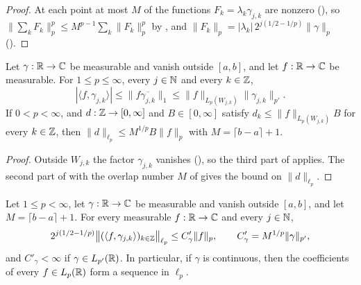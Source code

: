 \begin{proof}
\leanok
{}
At each point at most $M$ of the functions $F_k = \lambda_k \gamma_{j,k}$ are nonzero
(), so
$\|\sum_k F_k\|_p^p \leq M^{p-1} \sum_k \|F_k\|_p^p$ by , and
$\|F_k\|_p = |\lambda_k| \, 2^{j(1/2 - 1/p)} \|\gamma\|_p$ ().
\end{proof}

\begin{lemma}
\label{lem:daub-coeff-local}
\leanok
{}
Let $\gamma : \mathbb{R} \to \mathbb{C}$ be measurable and vanish outside $[a, b]$, and let $f : \mathbb{R} \to \mathbb{C}$ be
measurable. For $1 \leq p \leq \infty$, every $j \in \mathbb{N}$ and every $k \in \mathbb{Z}$,
\[
  |\langle f, \gamma_{j,k} \rangle| \leq \|f \overline{\gamma_{j,k}}\|_1
  \leq \|f\|_{L_p(W_{j,k})} \|\gamma_{j,k}\|_{p'} .
\]
If $0 < p < \infty$, and $d : \mathbb{Z} \to [0, \infty]$ and $B \in [0, \infty]$ satisfy
$d_k \leq \|f\|_{L_p(W_{j,k})} B$ for every $k \in \mathbb{Z}$, then
$\|d\|_{\ell_p} \leq M^{1/p} B \|f\|_p$ with $M = \lceil b - a \rceil + 1$.
\end{lemma}

\begin{proof}
\leanok
{}
Outside $W_{j,k}$ the factor $\gamma_{j,k}$ vanishes (), so the
third part of  applies. The second part of
 with the overlap number $M$ of 
gives the bound on $\|d\|_{\ell_p}$.
\end{proof}

\begin{proposition}
\label{prop:daub-coeff-estimate}
\leanok
{}
Let $1 \leq p < \infty$, let $\gamma : \mathbb{R} \to \mathbb{C}$ be measurable and vanish outside $[a, b]$, and
let $M = \lceil b - a \rceil + 1$. For every measurable $f : \mathbb{R} \to \mathbb{C}$ and every $j \in \mathbb{N}$,
\[
  2^{j(1/2 - 1/p)} \bigl\|(\langle f, \gamma_{j,k} \rangle)_{k \in \mathbb{Z}}\bigr\|_{\ell_p}
  \leq C'_\gamma \|f\|_p , \qquad C'_\gamma = M^{1/p} \|\gamma\|_{p'} ,
\]
and $C'_\gamma < \infty$ if $\gamma \in L_{p'}(\mathbb{R})$. In particular, if $\gamma$ is continuous,
then the coefficients of every $f \in L_p(\mathbb{R})$ form a sequence in $\ell_p$.
\end{proposition}

